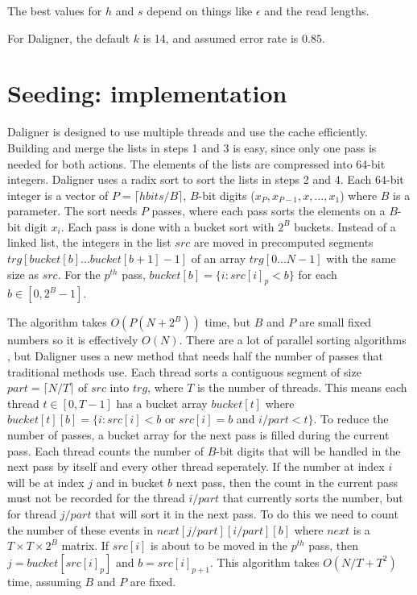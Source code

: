 \documentclass[../main/thesis.tex]{subfiles}
\begin{document}

The best values for $h$ and $s$ depend on things like $\epsilon$ and the read lengths.

For Daligner, the default $k$ is 14, and assumed error rate is $0.85$.



\section{Seeding: implementation}
Daligner is designed to use multiple threads and use the cache efficiently.
Building and merge the lists in steps 1 and 3 is easy, since only one pass is needed for both actions.
The elements of the lists are compressed into 64-bit integers.
Daligner uses a radix sort \cite{sorting}\cite{radix} to sort the lists in steps 2 and 4.
Each 64-bit integer is a vector of $P=\lceil hbits/B\rceil$, $B$-bit digits ($x_P,x_{P-1},x,...,x_1$) where $B$ is a parameter.
The sort needs $P$ passes, where each pass sorts the elements on a $B$-bit digit $x_i$.
Each pass is done with a bucket sort \cite{sorting} with $2^B$ buckets.
Instead of a linked list, the integers in the list $src$ are moved in precomputed segments $trg[bucket[b]...bucket[b+1]-1]$ of an array $trg[0...N-1]$ with the same size as $src$.
For the $p^{th}$ pass, $bucket[b] = \{i: src[i]_p < b\}$ for each $b \in [0,2^B-1]$.



The algorithm takes $O(P(N+2^B))$ time, but $B$ and $P$ are small fixed numbers so it is effectively $O(N)$.
There are a lot of parallel sorting algorithms \cite{parRadix1}\cite{parRadix2}, but Daligner uses a new method that needs half the number of passes that traditional methods use.
Each thread sorts a contiguous segment of size $part = \lceil N/T\rceil$ of $src$ into $trg$, where $T$ is the number of threads.
This means each thread $t \in [0,T-1]$ has a bucket array $bucket[t]$ where $bucket[t][b] = \{i: src[i] < b$ or $src[i] = b$ and $i/part < t\}$.
To reduce the number of passes, a bucket array for the next pass is filled during the current pass.
Each thread counts the number of $B$-bit digits that will be handled in the next pass by itself and every other thread seperately.
If the number at index $i$ will be at index $j$ and in bucket $b$ next pass, then the count in the current pass must not be recorded for the thread $i/part$ that currently sorts the number, but for thread $j/part$ that will sort it in the next pass.
To do this we need to count the number of these events in $next[j/part][i/part][b]$ where $next$ is a $T\times T\times 2^B$ matrix.
If $src[i]$ is about to be moved in the $p^{th}$ pass, then $j = bucket[src[i]_p]$ and $b = src[i]_{p+1}$.
This algorithm takes $O(N/T+T^2)$ time, assuming $B$ and $P$ are fixed.
\end{document}
